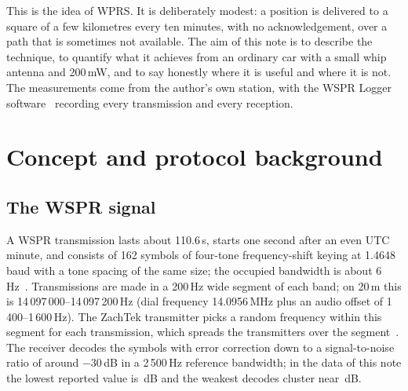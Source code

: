 \documentclass[10pt,a4paper]{article}
\begin{document}
This is the idea of WPRS. It is deliberately modest: a position is delivered to a square of a few kilometres every ten minutes, with no acknowledgement, over a path that is sometimes not available. The aim of this note is to describe the technique, to quantify what it achieves from an ordinary car with a small whip antenna and 200\,mW, and to say honestly where it is useful and where it is not. The measurements come from the author's own station, with the WSPR Logger software~\cite{logger} recording every transmission and every reception.

\section{Concept and protocol background}
\subsection{The WSPR signal}
A WSPR transmission lasts about 110.6\,s, starts one second after an even UTC minute, and consists of 162 symbols of four-tone frequency-shift keying at 1.4648\,baud with a tone spacing of the same size; the occupied bandwidth is about 6\,Hz~\cite{wsjtx}. Transmissions are made in a 200\,Hz wide segment of each band; on 20\,m this is 14\,097\,000--14\,097\,200\,Hz (dial frequency 14.0956\,MHz plus an audio offset of 1\,400--1\,600\,Hz). The ZachTek transmitter picks a random frequency within this segment for each transmission, which spreads the transmitters over the segment~\cite{zachtek}. The receiver decodes the symbols with error correction down to a signal-to-noise ratio of around $-30$\,dB in a 2\,500\,Hz reference bandwidth; in the data of this note the lowest reported value is \wSnrMin\,dB and the weakest decodes cluster near \wFloor\,dB.
\end{document}
